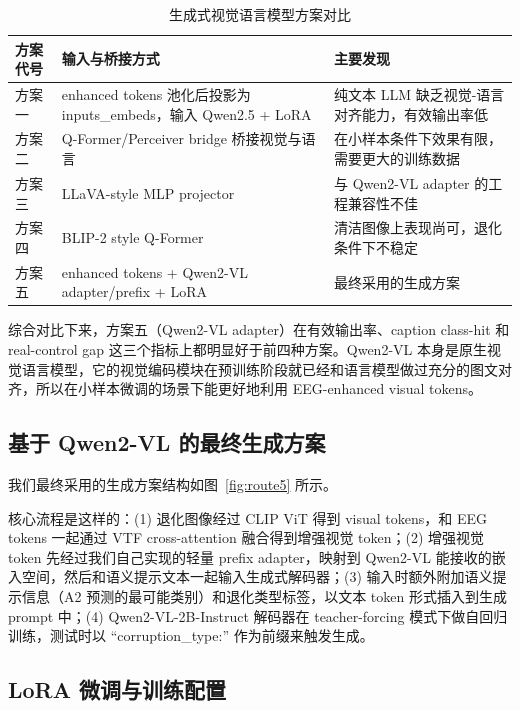 \begin{table}[htbp]
  \centering
  \caption{生成式视觉语言模型方案对比}
  \label{tab:route-comparison}
  \begin{tabularx}{\linewidth}{l l X}
    \toprule
    方案代号 & 输入与桥接方式 & 主要发现 \\
    \midrule
    方案一 & enhanced tokens 池化后投影为 inputs\_embeds，输入 Qwen2.5 + LoRA & 纯文本 LLM 缺乏视觉-语言对齐能力，有效输出率低 \\
    方案二 & Q-Former/Perceiver bridge 桥接视觉与语言 & 在小样本条件下效果有限，需要更大的训练数据 \\
    方案三 & LLaVA-style MLP projector & 与 Qwen2-VL adapter 的工程兼容性不佳 \\
    方案四 & BLIP-2 style Q-Former & 清洁图像上表现尚可，退化条件下不稳定 \\
    方案五 & enhanced tokens + Qwen2-VL adapter/prefix + LoRA & 最终采用的生成方案 \\
    \bottomrule
  \end{tabularx}
\end{table}

综合对比下来，方案五（Qwen2-VL adapter）在有效输出率、caption class-hit 和 real-control gap 这三个指标上都明显好于前四种方案。Qwen2-VL 本身是原生视觉语言模型，它的视觉编码模块在预训练阶段就已经和语言模型做过充分的图文对齐，所以在小样本微调的场景下能更好地利用 EEG-enhanced visual tokens。

\subsection{基于 Qwen2-VL 的最终生成方案}

我们最终采用的生成方案结构如图~\ref{fig:route5} 所示。


核心流程是这样的：(1) 退化图像经过 CLIP ViT 得到 visual tokens，和 EEG tokens 一起通过 VTF cross-attention 融合得到增强视觉 token；(2) 增强视觉 token 先经过我们自己实现的轻量 prefix adapter，映射到 Qwen2-VL 能接收的嵌入空间，然后和语义提示文本一起输入生成式解码器；(3) 输入时额外附加语义提示信息（A2 预测的最可能类别）和退化类型标签，以文本 token 形式插入到生成 prompt 中；(4) Qwen2-VL-2B-Instruct 解码器在 teacher-forcing 模式下做自回归训练，测试时以 ``corruption\_type:'' 作为前缀来触发生成。

\subsection{LoRA 微调与训练配置}

